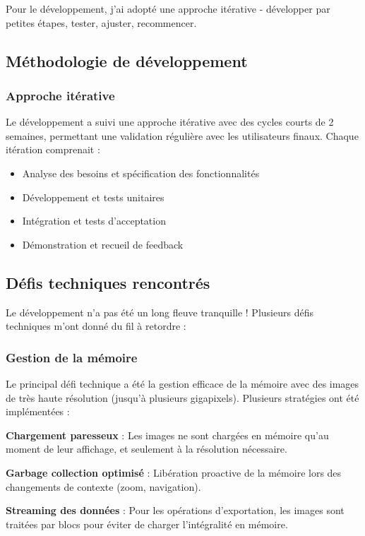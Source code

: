 \documentclass[11pt,a4paper]{report}
\begin{document}
Pour le développement, j'ai adopté une approche itérative - développer par petites étapes, tester, ajuster, recommencer.

\subsection{Méthodologie de développement}

\subsubsection{Approche itérative}

Le développement a suivi une approche itérative avec des cycles courts de 2 semaines, permettant une validation régulière avec les utilisateurs finaux. Chaque itération comprenait :
\begin{itemize}
\item Analyse des besoins et spécification des fonctionnalités
\item Développement et tests unitaires
\item Intégration et tests d'acceptation
\item Démonstration et recueil de feedback
\end{itemize}

\subsection{Défis techniques rencontrés}

Le développement n'a pas été un long fleuve tranquille ! Plusieurs défis techniques m'ont donné du fil à retordre :

\subsubsection{Gestion de la mémoire}

Le principal défi technique a été la gestion efficace de la mémoire avec des images de très haute résolution (jusqu'à plusieurs gigapixels). Plusieurs stratégies ont été implémentées :

\textbf{Chargement paresseux} : Les images ne sont chargées en mémoire qu'au moment de leur affichage, et seulement à la résolution nécessaire.

\textbf{Garbage collection optimisé} : Libération proactive de la mémoire lors des changements de contexte (zoom, navigation).

\textbf{Streaming des données} : Pour les opérations d'exportation, les images sont traitées par blocs pour éviter de charger l'intégralité en mémoire.
\end{document}
